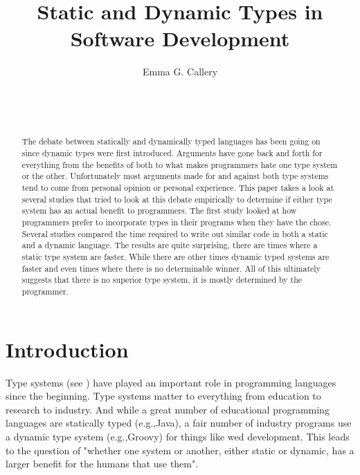\documentclass{sig-alternate}
\begin{document}
\title{Static and Dynamic Types in Software Development}
\author{
\alignauthor
Emma G. Callery\\
	\\
	\\
	\\
}

\maketitle

\begin{abstract}
The debate between statically and dynamically typed languages has been going on since dynamic types were first introduced. Arguments have gone back and forth for everything from the benefits of both to what makes programmers hate one type system or the other. Unfortunately most arguments made for and against both type systems tend to come from personal opinion or personal experience. 
This paper takes a look at several studies that tried to look at this debate empirically to determine if either type system has an actual benefit to programmers. The first study looked at how programmers prefer to incorporate types in their programs when they have the chose. Several studies compared the time required to write out similar code in both a static and a dynamic language. 
The results are quite surprising, there are times where a static type system are faster. While there are other times dynamic typed systems are faster and even times where there is no determinable winner. All of this ultimately suggests that there is no superior type system, it is mostly determined by the programmer.  
\end{abstract}


\section{Introduction}\label{intro}
Type systems (see \citep{Pierce2002}) have played an important role in programming languages since the beginning. Type systems matter to everything from education to research to industry. And while a great number of educational programming languages are statically typed (e.g.,Java), a fair number of industry programs use a dynamic type system (e.g.,Groovy) for things like wed development. This leads to the question of "whether one system or another, either static or dynamic, has a larger benefit for the humans that use them"\cite{Mayer2012}. 
\end{document}
